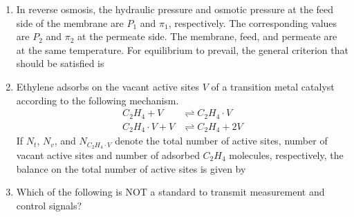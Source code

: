 \documentclass[journal,12pt,onecolumn]{IEEEtran}
\theoremstyle{remark}
\begin{document}
\begin{enumerate}
\hfill{}

\item In reverse osmosis, the hydraulic pressure and osmotic pressure at the feed side of the membrane are $P_1$ and $\pi_1$, respectively. The corresponding values are $P_2$ and $\pi_2$ at the permeate side. The membrane, feed, and permeate are at the same temperature. For equilibrium to prevail, the general criterion that should be satisfied is

\hfill{}

\begin{enumerate}
\end{enumerate}

\item Ethylene adsorbs on the vacant active sites $V$ of a transition metal catalyst according to the following mechanism.
\begin{align*}
C_2H_4 + V &\rightleftharpoons C_2H_4 \cdot V \\
C_2H_4 \cdot V + V &\rightleftharpoons C_2H_4 + 2V
\end{align*}
If $N_t$, $N_v$, and $N_{C_2H_4 \cdot V}$ denote the total number of active sites, number of vacant active sites and number of adsorbed $C_2H_4$ molecules, respectively, the balance on the total number of active sites is given by

\hfill{}

\begin{enumerate}
\end{enumerate}

\item Which of the following is NOT a standard to transmit measurement and control signals?


\end{enumerate}
\end{document}
